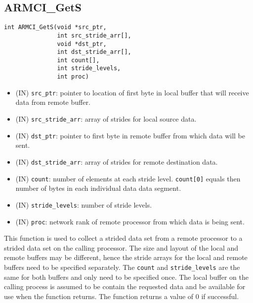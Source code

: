\documentclass[12pt]{article}
\begin{document}
\subsection{ARMCI\_GetS}
\begin{verbatim}
int ARMCI_GetS(void *src_ptr,
               int src_stride_arr[],
               void *dst_ptr,
               int dst_stride_arr[],
               int count[],
               int stride_levels,
               int proc)
\end{verbatim}
\begin{itemize}
\item (IN) \texttt{src\_ptr}: pointer to location of first byte in local buffer
that will receive data from remote buffer.
\item (IN) \texttt{src\_stride\_arr}: array of strides for local source data.
\item (IN) \texttt{dst\_ptr}: pointer to first byte in remote buffer from which
data will be sent.
\item (IN) \texttt{dst\_stride\_arr}: array of strides for remote destination data.
\item (IN) \texttt{count}: number of elements at each stride level.
\texttt{count[0]} equals then number of bytes in each individual data data segment.
\item (IN) \texttt{stride\_levels}: number of stride levels.
\item (IN) \texttt{proc}: network rank of remote processor from which data is
being sent.
\end{itemize}
This function is used to collect a strided data set from a remote processor to a
strided data set on the calling processor. The size and layout of the local and
remote buffers may be different, hence the stride arrays for the local and
remote buffers need to be specified separately. The \texttt{count} and
\texttt{stride\_levels} are the same for both buffers and only need to be
specified once. The local buffer on the calling process is assumed to be
contain the requested data and be available for use when the function returns. The
function returns a value of 0 if successful.
\end{document}
